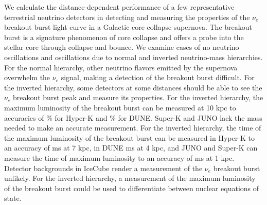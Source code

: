 We calculate the distance-dependent performance of a few representative terrestrial 
neutrino detectors in detecting and measuring the properties of the $\nu_e$
breakout 
burst light curve in a Galactic core-collapse supernova. The breakout 
burst is a signature phenomenon of core collapse and offers a probe
into 
the stellar core through collapse and bounce. We examine cases of 
no neutrino oscillations and oscillations due to normal and inverted 
neutrino-mass hierarchies. For the normal hierarchy, other neutrino 
flavors emitted by the supernova overwhelm the $\nu_e$ signal, making a 
detection of the breakout burst difficult. For the inverted hierarchy, 
some detectors at some distances should be able to see the $\nu_e$ breakout 
burst peak and measure its properties. For the inverted hierarchy, the 
maximum luminosity of the breakout burst can be measured at 10 kpc to 
accuracies of \% for Hyper-K and \% for DUNE. Super-K and JUNO lack 
the mass needed to make an accurate measurement. 
For the inverted
hierarchy, 
the time of the maximum luminosity of the breakout burst can be
measured 
in Hyper-K to an accuracy of  ms at 7 kpc, in DUNE  ms at 4 kpc, 
and JUNO and Super-K can measure the time of maximum luminosity to 
an accuracy of  ms at 1 kpc. 
Detector backgrounds in IceCube render a measurement of the $\nu_e$
breakout burst unlikely.
For the inverted hierarchy, a 
measurement of the maximum luminosity of the breakout burst could 
be used to differentiate between nuclear equations of state. 
